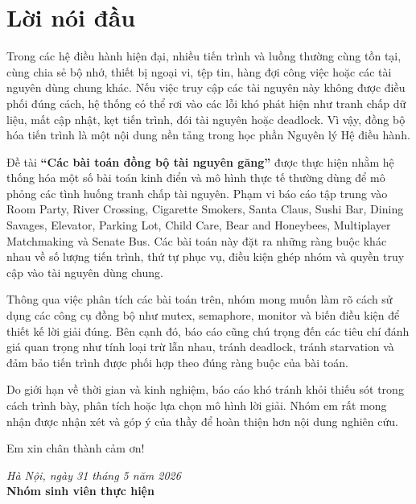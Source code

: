 \chapter*{Lời nói đầu}

Trong các hệ điều hành hiện đại, nhiều tiến trình và luồng thường cùng tồn tại, cùng chia sẻ bộ nhớ, thiết bị ngoại vi, tệp tin, hàng đợi công việc hoặc các tài nguyên dùng chung khác. Nếu việc truy cập các tài nguyên này không được điều phối đúng cách, hệ thống có thể rơi vào các lỗi khó phát hiện như tranh chấp dữ liệu, mất cập nhật, kẹt tiến trình, đói tài nguyên hoặc deadlock. Vì vậy, đồng bộ hóa tiến trình là một nội dung nền tảng trong học phần Nguyên lý Hệ điều hành.

Đề tài \textbf{``Các bài toán đồng bộ tài nguyên găng''} được thực hiện nhằm hệ thống hóa một số bài toán kinh điển và mô hình thực tế thường dùng để mô phỏng các tình huống tranh chấp tài nguyên. Phạm vi báo cáo tập trung vào Room Party, River Crossing, Cigarette Smokers, Santa Claus, Sushi Bar, Dining Savages, Elevator, Parking Lot, Child Care, Bear and Honeybees, Multiplayer Matchmaking và Senate Bus. Các bài toán này đặt ra những ràng buộc khác nhau về số lượng tiến trình, thứ tự phục vụ, điều kiện ghép nhóm và quyền truy cập vào tài nguyên dùng chung.

Thông qua việc phân tích các bài toán trên, nhóm mong muốn làm rõ cách sử dụng các công cụ đồng bộ như mutex, semaphore, monitor và biến điều kiện để thiết kế lời giải đúng. Bên cạnh đó, báo cáo cũng chú trọng đến các tiêu chí đánh giá quan trọng như tính loại trừ lẫn nhau, tránh deadlock, tránh starvation và đảm bảo tiến trình được phối hợp theo đúng ràng buộc của bài toán.

Do giới hạn về thời gian và kinh nghiệm, báo cáo khó tránh khỏi thiếu sót trong cách trình bày, phân tích hoặc lựa chọn mô hình lời giải. Nhóm em rất mong nhận được nhận xét và góp ý của thầy để hoàn thiện hơn nội dung nghiên cứu.

Em xin chân thành cảm ơn!

\vspace{1.5cm}
\begin{flushright}
    \textit{Hà Nội, ngày 31 tháng 5 năm 2026} \\
    \vspace{0.2cm}
    \textbf{Nhóm sinh viên thực hiện} \\
\end{flushright}

